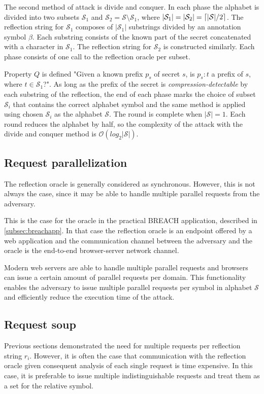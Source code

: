 \documentclass{sig-alternate-05-2015}
\DeclarePairedDelimiter{\ceil}{\lceil}{\rceil}
\begin{document}
The second method of attack is divide and conquer. In each phase the alphabet is
divided into two subsets $\mathcal{S}_1$ and $\mathcal{S}_2 = \mathcal{S}
\setminus \mathcal{S}_1$, where $|\mathcal{S}_1| = |\mathcal{S}_2| =
\ceil{|\mathcal{S}| / 2}$. The reflection string for $\mathcal{S}_1$ composes of
$|\mathcal{S}_1|$ substrings divided by an annotation symbol $\beta$. Each
substring consists of the known part of the secret concatenated with a character
in $\mathcal{S}_1$. The reflection string for $\mathcal{S}_2$ is constructed
similarly. Each phase consists of one call to the reflection oracle per subset.

Property $Q$ is defined "Given a known prefix $p_s$ of secret $s$, is $p_s:t$ a
prefix of $s$, where $t \in \mathcal{S}_1$?". As long as the prefix of the
secret is \textit{compression-detectable} by each substring of the reflection,
the end of each phase marks the choice of subset $\mathcal{S}_i$ that contains
the correct alphabet symbol and the same method is applied using chosen
$\mathcal{S}_i$ as the alphabet $\mathcal{S}$. The round is complete when
$|\mathcal{S}| = 1$. Each round reduces the alphabet by half, so the complexity
of the attack with the divide and conquer method  is
$\mathcal{O}(log_2|\mathcal{S}|)$.

\subsection{Request parallelization}\label{subsec:parallel}
The reflection oracle is generally considered as synchronous. However, this is not
always the case, since it may be able to handle multiple parallel requests from
the adversary.

This is the case for the oracle in the practical BREACH application, described
in \ref{subsec:breachapp}. In that case the reflection oracle is an endpoint
offered by a web application and the communication channel between the adversary
and the oracle is the end-to-end browser-server network channel.

Modern web servers are able to handle multiple parallel requests and
browsers can issue a certain amount of parallel requests per domain. This
functionality enables the adversary to issue multiple parallel requests per
symbol in alphabet $\mathcal{S}$ and efficiently reduce the execution time of
the attack.

\subsection{Request soup}
Previous sections demonstrated the need for multiple requests per reflection
string $r_i$. However, it is often the case that communication with the
reflection oracle given consequent analysis of each single request is time
expensive. In this case, it is preferable to issue multiple indistinguishable
requests and treat them as a set for the relative symbol.
\end{document}
